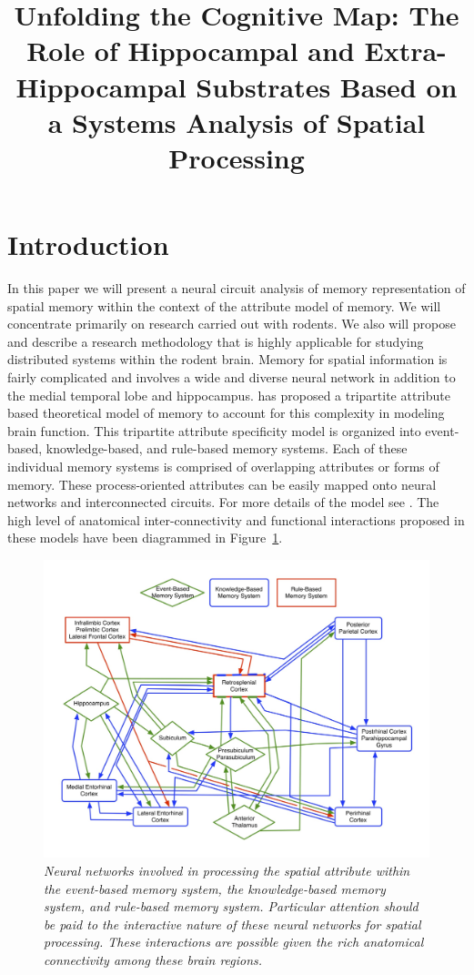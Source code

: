 \documentclass[doc, longtable]{apa6}
\title{Unfolding the Cognitive Map: The Role of Hippocampal and Extra-Hippocampal Substrates Based on a Systems Analysis of Spatial Processing}
\begin{document}
\maketitle

\section{Introduction}
In this paper we will present a neural circuit analysis of memory representation of spatial memory within the context of the attribute model of memory. We will concentrate primarily on research carried out with rodents. We also will propose and describe a research methodology that is highly applicable for studying distributed systems within the rodent brain. Memory for spatial information is fairly complicated and involves a wide and diverse neural network in addition to the medial temporal lobe and hippocampus. \textcite{Kesner1998c} has proposed a tripartite attribute based theoretical model of memory to account for this complexity in modeling brain function. This tripartite attribute specificity model is organized into event-based, knowledge-based, and rule-based memory systems. Each of these individual memory systems is comprised of overlapping attributes or forms of memory. These process-oriented attributes can be easily mapped onto neural networks and interconnected circuits. For more details of the model see \textcite{Kesner1998c,Kesner2013e,Kesner2002}. The high level of anatomical inter-connectivity and functional interactions proposed in these models have been diagrammed in Figure~\ref{fig1}. 

\begin{figure}[htp!]
\includegraphics[width=.99\textwidth]{FIGURE1.jpg}
\centering
\begin{singlespace}
\caption{\textit{Neural networks involved in processing the spatial attribute within the event-based memory system, the knowledge-based memory system, and rule-based memory system. Particular attention should be paid to the interactive nature of these neural networks for spatial processing. These interactions are possible given the rich anatomical connectivity among these brain regions.}}
\label{fig1}
\end{singlespace}
\end{figure}
\end{document}
